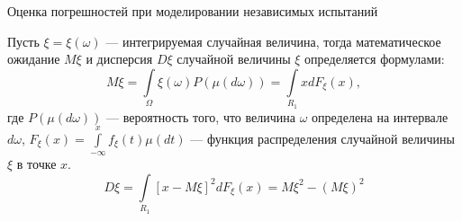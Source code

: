 \documentclass{beamer}
\begin{document}
	\begin{frame} {Оценка погрешностей при моделировании независимых испытаний}

		
		Пусть $\xi=\xi(\omega)$ --- интегрируемая случайная величина, тогда математическое ожидание $M\xi$ и дисперсия $D\xi$ случайной величины $\xi$ определяется формулами:
		\[
			M\xi = \int\limits_{\varOmega} \xi (\omega) P(\mu (d \omega) )
			= \int \limits_{R_1} x  d F_{\xi}(x) 
			,
		\]
		где $P(\mu( d \omega))$ %
		--- вероятность того, что величина $\omega$ определена на интервале $d\omega$, 
		$F_{\xi} (x)=\int \limits_{-\infty}^{x} f_{\xi} (t) \mu (dt)$ --- функция распределения случайной величины $\xi$ в точке $x$.
		\[
			D\xi = \int \limits_{R_1} {[x - M \xi]}^2 d F_{\xi}(x) 
			= M \xi^2 - {(M \xi)}^2
		\]

				
	\end{frame}
\end{document}
